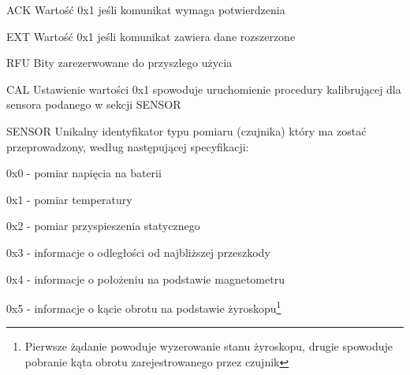 \begin{basedescript}{\desclabelstyle{\pushlabel}\desclabelwidth{25mm}}
\setlength{\parsep}{0pt}
\setlength{\itemsep}{0mm}
\setlength{\parskip}{0pt}
\item[ACK]
	Wartość 0x1 jeśli komunikat wymaga potwierdzenia
\item[EXT] 
	Wartość 0x1 jeśli komunikat zawiera dane rozszerzone
\item[RFU] 
	Bity zarezerwowane do przyszłego użycia
\item[CAL] 
	Ustawienie wartości 0x1 spowoduje uruchomienie procedury kalibrującej
	dla sensora podanego w sekcji SENSOR
\item[SENSOR] 
	Unikalny identyfikator typu pomiaru (czujnika) który ma zostać przeprowadzony,
	według następującej specyfikacji:
	\begin{desc}
	\item[0x0] - pomiar napięcia na baterii
	\item[0x1] - pomiar temperatury
	\item[0x2] - pomiar przyspieszenia statycznego
	\item[0x3] - informacje o odległości od najbliższej przeszkody
	\item[0x4] - informacje o położeniu na podstawie magnetometru
	\item[0x5] - informacje o kącie obrotu na podstawie
	żyroskopu\footnote{Pierwsze żądanie powoduje wyzerowanie stanu żyroskopu, drugie spowoduje pobranie kąta obrotu zarejestrowanego przez czujnik}
	\end{desc}
\end{basedescript}

